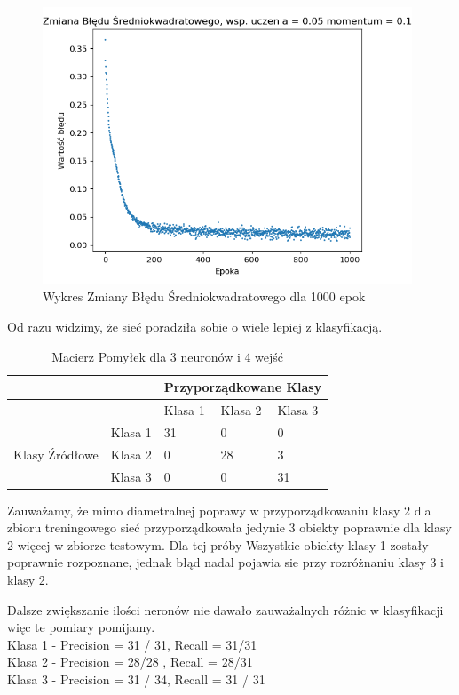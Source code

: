 \documentclass[12pt]{article}
\begin{document}
\begin{figure}[!htb]
 \centering
 \includegraphics[width=11cm]{WykresBlad3neuron4wejscia.png}
 \caption{Wykres Zmiany Błędu Średniokwadratowego dla 1000 epok}
 \vspace{-0.1cm}
 \label{WykresBlad2}
\end{figure}

Od razu widzimy, że sieć poradziła sobie o wiele lepiej z klasyfikacją.\\


\begin{table}
\caption{\label{tab:tablica2} Macierz Pomyłek dla 3 neuronów i 4 wejść }
\begin{tabular}{ |p{3cm}|p{3cm}|p{2cm}|p{2cm}|p{2cm}|  }
 \hline
 & & 
 \multicolumn{3}{|c|}{Przyporządkowane Klasy} \\
 \hline

   & & Klasa 1 & Klasa 2 & Klasa 3\\
 \hline
\multirow{3}{4em}{Klasy Źródłowe}
   & Klasa 1 & 31 & 0 & 0 \\ 
   & Klasa 2 & 0 & 28 & 3 \\
   & Klasa 3 & 0 & 0 & 31 \\

 \hline
\end{tabular}
\end{table}

Zauważamy, że mimo diametralnej poprawy w przyporządkowaniu klasy 2 dla zbioru treningowego sieć przyporządkowała jedynie 3 obiekty poprawnie dla klasy 2 więcej w zbiorze testowym.
Dla tej próby Wszystkie obiekty klasy 1 zostały poprawnie rozpoznane, jednak błąd nadal pojawia sie przy rozróżnaniu klasy 3 i klasy 2.

Dalsze zwiększanie ilości neronów nie dawało zauważalnych różnic w klasyfikacji więc te pomiary pomijamy.
\\Klasa 1 - Precision = 31 / 31, Recall = 31/31\\
Klasa 2 - Precision = 28/28 , Recall = 28/31\\
Klasa 3 - Precision = 31 / 34, Recall = 31 / 31\\
\end{document}
